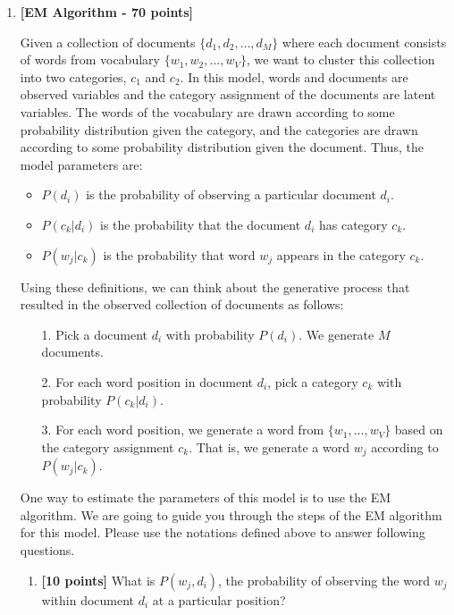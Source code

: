\begin{enumerate}
  \item {\bf [EM Algorithm - 70 points]}

    Given a collection of documents $\{d_1, d_2, \dots , d_M\}$ where each 
    document consists of words from vocabulary 
    $\{w_1, w_2, \dots, w_V\}$, we want to cluster this collection into two 
    categories, $c_1$ and $c_2$. 
    In this model, words and documents are observed variables and the category assignment of the
    documents are latent variables. The words of the vocabulary are drawn according
		to some probability distribution given the category, and the categories are drawn
    according to some probability distribution given the document. Thus, the model parameters are:

    \begin{itemize}
      \item $P(d_i)$ is the probability of observing a particular document $d_i$.
      \item $P(c_k | d_i)$ is the probability that the document $d_i$ has 
        category $c_k$.
      \item $P(w_j| c_k)$ is the probability that word $w_j$ appears in the category $c_k$.
    \end{itemize}


    Using these definitions, we can think about the generative process that 
    resulted in the observed collection of documents as follows:

    \begin{enumerate}
      \item[1.] Pick a document $d_i$ with probability $P(d_i)$. We generate 
        $M$ documents.
      \item[2.] For each word position in document $d_i$, pick a category $c_k$ with probability $P(c_k | d_i)$.
      \item[3.] For each word position, we generate a word from 
        $\{w_1, \dots, w_V\}$ based on the category assignment $c_k$. That is, we generate a word $w_j$ according to 
        $P(w_j | c_k)$.
    \end{enumerate}

    One way to estimate the parameters of this model is to use the EM algorithm. We 
    are going to guide you through the steps of the EM algorithm for this model. Please 
    use the notations defined above to answer following questions.

    \begin{enumerate}
      \item {\bf [10 points]}
        What is $P(w_j, d_i)$, the probability of observing the word $w_j$ within document $d_i$ at a particular position? 


\end{enumerate}
\end{enumerate}
